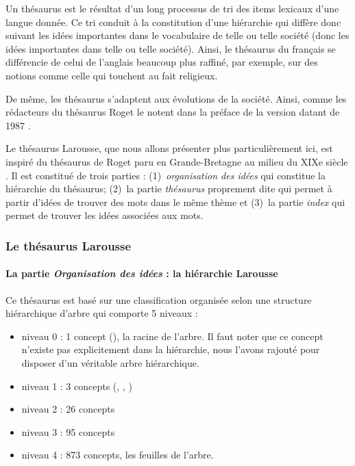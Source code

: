 Un thésaurus est le résultat d'un long processus de tri des items
lexicaux d'une langue donnée. Ce tri conduit à la constitution d'une
hiérarchie qui diffère donc suivant les idées importantes dans le
vocabulaire de telle ou telle société (donc les idées importantes dans
telle ou telle société).  Ainsi, le thésaurus du français se
différencie de celui de l'anglais beaucoup plus raffiné, par exemple,
sur des notions comme celle qui touchent au fait religieux.

De même, les thésaurus s'adaptent aux évolutions de la société. Ainsi,
comme les rédacteurs du thésaurus Roget le notent dans la préface de
la version datant de 1987 \cite{Roget1987} .

Le thésaurus Larousse, que nous allons présenter plus particulièrement
ici, est inspiré du thésaurus de Roget paru en Grande-Bretagne au
milieu du XIXe siècle \cite{Roget1852}. Il est constitué de trois
parties : (1)~\emph{organisation des idées} qui constitue la
hiérarchie du thésaurus; (2)~la partie \emph{thésaurus} proprement
dite qui permet à partir d'idées de trouver des mots dans le même
thème et (3)~la partie \emph{index} qui permet de trouver les idées
associées aux mots.

\subsubsection{Le thésaurus Larousse}

\paragraph{La partie \emph{Organisation des idées} : la hiérarchie
  Larousse}
\label{sec:thes-hierarchie}

Ce thésaurus est basé sur une classification organisée selon une
structure hiérarchique d'arbre qui comporte 5 niveaux :

\begin{itemize}
\item niveau 0 : 1 concept (), la racine de l'arbre.
  Il faut noter que ce concept n'existe pas explicitement dans la
  hiérarchie, nous l'avons rajouté pour disposer d'un véritable arbre
  hiérarchique.
\item niveau 1 : 3 concepts (, ,
  )
\item niveau 2 : 26 concepts
\item niveau 3 : 95 concepts
\item niveau 4 : 873 concepts, les feuilles de l'arbre.
\end{itemize}


